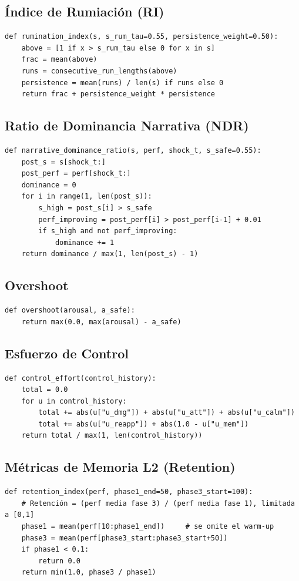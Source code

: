 \documentclass{article}
\begin{document}
\subsection{Índice de Rumiación (RI)}
\begin{verbatim}
def rumination_index(s, s_rum_tau=0.55, persistence_weight=0.50):
    above = [1 if x > s_rum_tau else 0 for x in s]
    frac = mean(above)
    runs = consecutive_run_lengths(above)
    persistence = mean(runs) / len(s) if runs else 0
    return frac + persistence_weight * persistence
\end{verbatim}

\subsection{Ratio de Dominancia Narrativa (NDR)}
\begin{verbatim}
def narrative_dominance_ratio(s, perf, shock_t, s_safe=0.55):
    post_s = s[shock_t:]
    post_perf = perf[shock_t:]
    dominance = 0
    for i in range(1, len(post_s)):
        s_high = post_s[i] > s_safe
        perf_improving = post_perf[i] > post_perf[i-1] + 0.01
        if s_high and not perf_improving:
            dominance += 1
    return dominance / max(1, len(post_s) - 1)
\end{verbatim}

\subsection{Overshoot}
\begin{verbatim}
def overshoot(arousal, a_safe):
    return max(0.0, max(arousal) - a_safe)
\end{verbatim}

\subsection{Esfuerzo de Control}
\begin{verbatim}
def control_effort(control_history):
    total = 0.0
    for u in control_history:
        total += abs(u["u_dmg"]) + abs(u["u_att"]) + abs(u["u_calm"])
        total += abs(u["u_reapp"]) + abs(1.0 - u["u_mem"])
    return total / max(1, len(control_history))
\end{verbatim}

\subsection{Métricas de Memoria L2 (Retention)}
\begin{verbatim}
def retention_index(perf, phase1_end=50, phase3_start=100):
    # Retención = (perf media fase 3) / (perf media fase 1), limitada a [0,1]
    phase1 = mean(perf[10:phase1_end])     # se omite el warm-up
    phase3 = mean(perf[phase3_start:phase3_start+50])
    if phase1 < 0.1:
        return 0.0
    return min(1.0, phase3 / phase1)
\end{verbatim}
\end{document}
